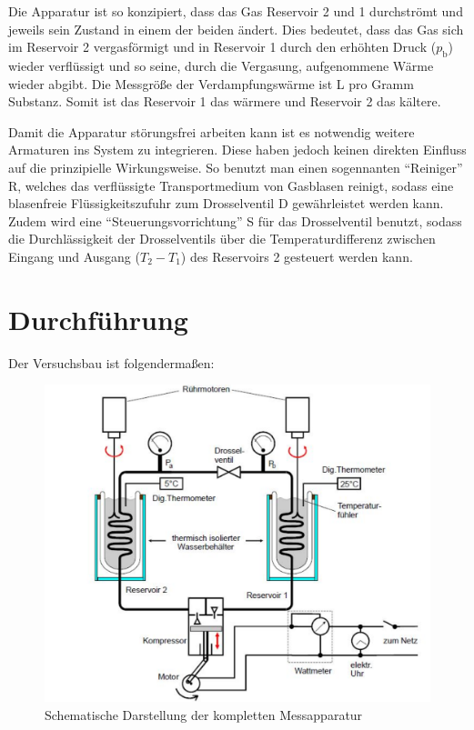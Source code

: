         Die Apparatur ist so konzipiert, dass das Gas Reservoir 2 und 1 durchströmt und jeweils sein Zustand in einem der beiden ändert. Dies bedeutet, dass das Gas sich im Reservoir 2 
        vergasförmigt und in Reservoir 1 durch den erhöhten Druck ($p_\text{b}$) wieder verflüssigt und so seine, durch die Vergasung, aufgenommene Wärme wieder abgibt. Die Messgröße der 
        Verdampfungswärme ist L pro Gramm Substanz.  Somit ist das Reservoir 1 das wärmere und Reservoir 2 das kältere.

        Damit die Apparatur störungsfrei arbeiten kann ist es notwendig weitere Armaturen ins System zu integrieren. Diese haben jedoch keinen direkten Einfluss auf die prinzipielle Wirkungsweise. 
        So benutzt man einen sogennanten "`Reiniger"' R, welches das verflüssigte Transportmedium von Gasblasen reinigt, sodass eine blasenfreie Flüssigkeitszufuhr zum Drosselventil D gewährleistet werden kann.
        Zudem wird eine "`Steuerungsvorrichtung"' S für das Drosselventil benutzt, sodass die Durchlässigkeit der Drosselventils über die Temperaturdifferenz zwischen Eingang und Ausgang ($T_2 - T_1$) 
        des Reservoirs 2 gesteuert werden kann.

    \newpage
    \section{Durchführung}
    Der Versuchsbau ist folgendermaßen:
    \begin{figure}
               \centering
               \includegraphics[width=\textwidth]{aufbau_2.pdf}
               \caption{Schematische Darstellung der kompletten Messapparatur}
               \label{fig:scheW}
    \end{figure}

